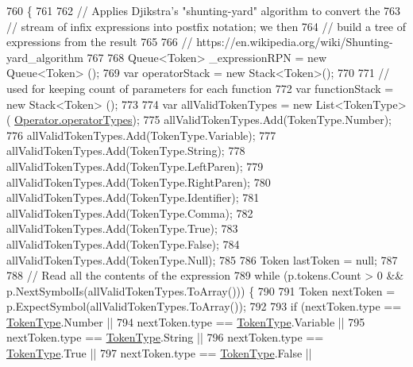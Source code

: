 \begin{DoxyCode}
760                                                                          \{
761 
762                 \textcolor{comment}{// Applies Djikstra's "shunting-yard" algorithm to convert the }
763                 \textcolor{comment}{// stream of infix expressions into postfix notation; we then}
764                 \textcolor{comment}{// build a tree of expressions from the result}
765 
766                 \textcolor{comment}{// https://en.wikipedia.org/wiki/Shunting-yard\_algorithm}
767 
768                 Queue<Token> \_expressionRPN = \textcolor{keyword}{new} Queue<Token> ();
769                 var operatorStack = \textcolor{keyword}{new} Stack<Token>();
770 
771                 \textcolor{comment}{// used for keeping count of parameters for each function}
772                 var functionStack = \textcolor{keyword}{new} Stack<Token> (); 
773 
774                 var allValidTokenTypes = \textcolor{keyword}{new} List<TokenType>(
      \hyperlink{a00072_a8dca7db3b76b8c358aba6068274e07df}{Operator.operatorTypes});
775                 allValidTokenTypes.Add(TokenType.Number);
776                 allValidTokenTypes.Add(TokenType.Variable);
777                 allValidTokenTypes.Add(TokenType.String);
778                 allValidTokenTypes.Add(TokenType.LeftParen);
779                 allValidTokenTypes.Add(TokenType.RightParen);
780                 allValidTokenTypes.Add(TokenType.Identifier);
781                 allValidTokenTypes.Add(TokenType.Comma);
782                 allValidTokenTypes.Add(TokenType.True);
783                 allValidTokenTypes.Add(TokenType.False);
784                 allValidTokenTypes.Add(TokenType.Null);
785 
786                 Token lastToken = null;
787 
788                 \textcolor{comment}{// Read all the contents of the expression}
789                 \textcolor{keywordflow}{while} (p.tokens.Count > 0 && p.NextSymbolIs(allValidTokenTypes.ToArray())) \{
790 
791                     Token nextToken = p.ExpectSymbol(allValidTokenTypes.ToArray());
792 
793                     \textcolor{keywordflow}{if} (nextToken.type == \hyperlink{a00040_a301aa7c866593a5b625a8fc158bbeace}{TokenType}.Number ||
794                         nextToken.type == \hyperlink{a00040_a301aa7c866593a5b625a8fc158bbeace}{TokenType}.Variable ||
795                         nextToken.type == \hyperlink{a00040_a301aa7c866593a5b625a8fc158bbeace}{TokenType}.String ||
796                         nextToken.type == \hyperlink{a00040_a301aa7c866593a5b625a8fc158bbeace}{TokenType}.True ||
797                         nextToken.type == \hyperlink{a00040_a301aa7c866593a5b625a8fc158bbeace}{TokenType}.False ||

\end{DoxyCode}
